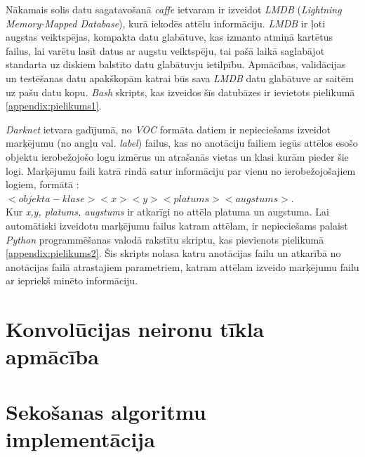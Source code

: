 Nākamais solis datu sagatavošanā \textit{caffe} ietvaram ir izveidot \textit{LMDB} (\textit{Lightning Memory-Mapped Database}), kurā iekodēs attēlu informāciju. \textit{LMDB} ir ļoti augstas veiktspējas, kompakta datu glabātuve, kas izmanto atmiņā kartētus failus, lai varētu lasīt datus ar augstu veiktspēju, tai pašā laikā saglabājot standarta uz diskiem balstīto datu glabātuvju ietilpību. Apmācības, validācijas un testēšanas datu apakškopām katrai būs sava \textit{LMDB} datu glabātuve ar saitēm uz pašu datu kopu. \textit{Bash} skripts, kas izveidos šīs datubāzes ir ievietots pielikumā \ref{appendix:pielikums1}.

\textit{Darknet} ietvara gadījumā, no \textit{VOC} formāta datiem ir nepieciešams izveidot marķējumu (no angļu val. \textit{label}) failus, kas no anotāciju failiem iegūs attēlos esošo objektu ierobežojošo logu izmērus un atrašanās vietas un klasi kurām pieder šie logi. Marķējumu faili katrā rindā satur informāciju par vienu no ierobežojošajiem logiem, formātā :\\ $<objekta-klase> <x> <y> <platums> <augstums>$.\\
Kur \textit{x,y, platums, augstums} ir atkarīgi no attēla platuma un augstuma. Lai automātiski izveidotu marķējumu failus katram attēlam, ir nepieciešams palaist \textit{Python} programmēšanas valodā rakstītu skriptu, kas pievienots pielikumā \ref{appendix:pielikums2}. Šis skripts nolasa katru anotācijas failu un atkarībā no anotācijas failā atrastajiem parametriem, katram attēlam izveido marķējumu failu ar iepriekš minēto informāciju.
\section{Konvolūcijas neironu tīkla apmācība}
\section{Sekošanas algoritmu implementācija}